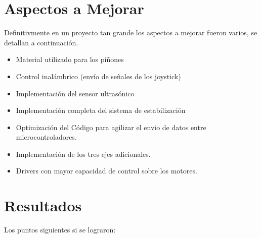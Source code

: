 \documentclass[12pt,letterpaper]{IEEEtran}
\begin{document}
\section{Aspectos a Mejorar} 

Definitivmente en un proyecto tan grande los aspectos a mejorar fueron varios, se detallan a continuación.

\begin{itemize} 
\item Material utilizado para los piñones 
\item Control inalámbrico (envío de señales de los joystick)
\item Implementación del sensor ultrasónico
\item Implementación completa del sistema de estabilización
\item Optimización del Código para agilizar el envio de datos entre microcontroladores.
\item Implementación de los tres ejes adicionales.
\item Drivers con mayor capacidad de control sobre los motores.

\end{itemize}
   

\section{Resultados}

Los puntos siguientes si se lograron:
\end{document}
